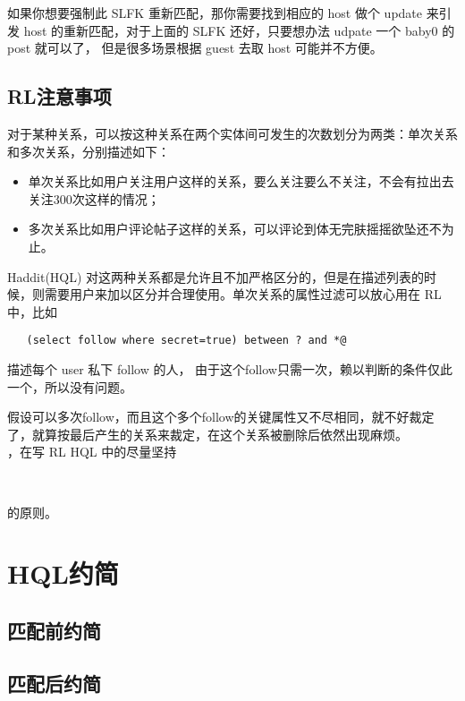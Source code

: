 \documentclass[10pt,a4paper]{article}
\begin{document}
\begin{CJK}{UTF8}{gbsn}
  如果你想要强制此 SLFK 重新匹配，那你需要找到相应的 host 做个 update 来引发 host 的重新匹配，对于上面的 SLFK 还好，只要想办法 udpate 一个 baby0 的 post 就可以了， 但是很多场景根据 guest 去取 host 可能并不方便。

  \subsection{RL注意事项}

  对于某种关系，可以按这种关系在两个实体间可发生的次数划分为两类：单次关系和多次关系，分别描述如下：
  \begin{itemize}
  \item 单次关系比如用户关注用户这样的关系，要么关注要么不关注，不会有拉出去关注300次这样的情况；
  \item 多次关系比如用户评论帖子这样的关系，可以评论到体无完肤摇摇欲坠还不为止。
  \end{itemize}

  Haddit(HQL) 对这两种关系都是允许且不加严格区分的，但是在描述列表的时候，则需要用户来加以区分并合理使用。单次关系的属性过滤可以放心用在 RL 中，比如
\begin{verbatim}
   (select follow where secret=true) between ? and *@
\end{verbatim}
  描述每个 user 私下 follow 的人， 由于这个follow只需一次，赖以判断的条件仅此一个，所以没有问题。

  假设可以多次follow，而且这个多个follow的关键属性又不尽相同，就不好裁定了，就算按最后产生的关系来裁定，在这个关系被删除后依然出现麻烦。\\

  ，在写 RL HQL 中的尽量坚持 \\
  \begin{center}
    \\
  \end{center}
  的原则。

  \section{HQL约简}
  \subsection{匹配前约简}
  \subsection{匹配后约简}


\end{CJK}
\end{document}
